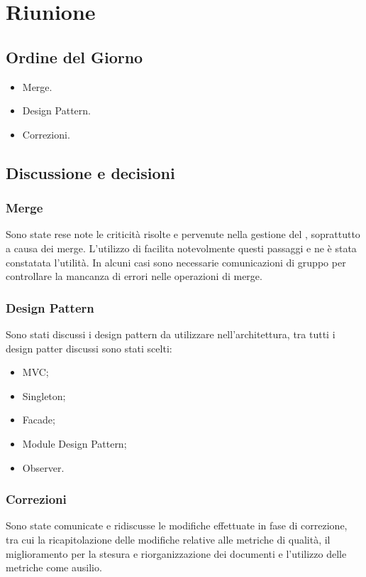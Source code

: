 \section{Riunione}
\subsection{Ordine del Giorno}
\begin{itemize}
	\item Merge.
	\item Design Pattern.
	\item Correzioni.
\end{itemize}

\subsection{Discussione e decisioni}

\subsubsection{Merge}
Sono state rese note le criticità risolte e pervenute nella gestione del , soprattutto a causa dei merge. L'utilizzo di  facilita notevolmente questi passaggi e ne è stata constatata l'utilità. In alcuni casi sono necessarie comunicazioni di gruppo per controllare la mancanza di errori nelle operazioni di merge.

\subsubsection{Design Pattern}
Sono stati discussi i design pattern da utilizzare nell'architettura, tra tutti i design patter discussi sono stati scelti:
\begin{itemize}
	\item MVC;
	\item Singleton;
	\item Facade;
	\item Module Design Pattern;
	\item Observer.
\end{itemize}

\subsubsection{Correzioni}
Sono state comunicate e ridiscusse le modifiche effettuate in fase di correzione, tra cui la ricapitolazione delle modifiche relative alle metriche di qualità, il miglioramento per la stesura e riorganizzazione dei documenti e l'utilizzo delle metriche come ausilio.


\clearpage
